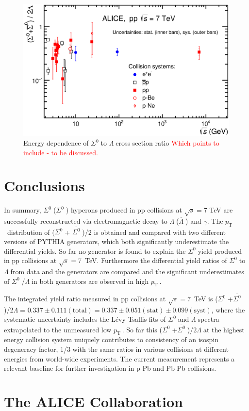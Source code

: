 \documentclass[ALICE,manyauthors]{cernphprep}
\newcommand{\sig}{\ensuremath{\Sigma^0  \; }}
\newcommand{\asig}{\ensuremath{\overline{\Sigma^0} \; }}
\newcommand{\lam}{\ensuremath{\Lambda \; }}
\newcommand{\alam}{\ensuremath{\overline{\Lambda} \; }}
\newcommand{\pt}{\ensuremath{p_{\mathrm{T}\; }}}
\newcommand{\red}{\textcolor{red}}
\providecommand{\DIFaddbegin}{} %
\providecommand{\DIFaddend}{} %
\providecommand{\DIFdelbegin}{} %
\providecommand{\DIFdelend}{} %
\begin{document}
\begin{figure}[h!]
 \centering

 \includegraphics[width=15.0cm]{Figure/2017nov1-Sigma0-LambdaRatio-WorldData.eps}

  \caption{Energy dependence of \sig to \lam  cross section ratio
 \red{ Which points to include - to be discussed.}  }
  \label{fig:SigLam-WorldData}
\end{figure}

 \section{Conclusions}
 \label{sec:conclusion}

In summary, \sig (\asig) hyperons produced in pp collisions at $\sqrt{s} = 7 $ TeV are successfully reconstructed  
via electromagnetic decay to \lam (\alam) and $\gamma$. The \pt~distribution of (\sig + \asig)/2 is obtained
and compared with two different versions of PYTHIA generators, which both significantly underestimate the differential yields. 
So far no generator is found to explain the \sig yield produced in pp collisions at $\sqrt{s} = 7$~TeV.
Furthermore the differential yield ratios of \sig to \lam from data and the generators are compared and
the significant underestimates of \sig/\lam in both generators are observed in high \pt. 

The integrated yield ratio measured in pp collisions at $\sqrt{s} = 7$~TeV is (\sig+\asig)/2\lam=
$0.337  \pm 0.111(\mathrm{total}) = 0.337   \pm 0.051(\mathrm{stat})  \pm 0.099 (\mathrm{syst})$, 
where the systematic uncertainty includes the L\'{e}vy-Tsallis fits of \sig and \lam spectra extrapolated to the unmeasured low \pt.
So far this (\sig+\asig)/2\lam at the highest energy collision system uniquely contributes to consistency of an isospin degeneracy 
factor, 1/3 with the same ratios in various collisions at different energies from world-wide experiments. The current 
measurement represents a relevant baseline for further investigation in p-Pb and Pb-Pb collisions. 

 \newpage
\DIFdelbegin %
\DIFdelend \DIFaddbegin {}
\DIFaddend 

\newpage
\appendix
\section{The ALICE Collaboration}
\label{app:collab}
\end{document}

